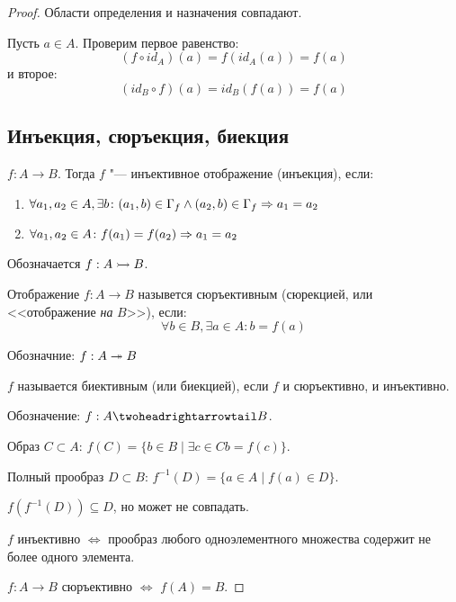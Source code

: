 \begin{proof}

Области определения и назначения совпадают.

Пусть $a \in A$. Проверим первое равенство:
\[(f \circ id_A)(a) = f(id_A(a)) = f(a)\]
и второе:
\[(id_B \circ f)(a) = id_B(f(a)) = f(a)\]

\subsection{Инъекция, сюръекция, биекция}
\begin{Def}
$f: A \to B$. Тогда $f$ "--- инъективное отображение (инъекция), если:

\begin{enumerate}
\item $\forall a_1, a_2 \in A, \exists b\colon (a_1, b) \in \Gamma_f \wedge (a_2, b) \in \Gamma_f \Rightarrow a_1 = a_2$
\item $\forall a_1, a_2 \in A\colon f(a_1) = f(a_2) \Rightarrow a_1 = a_2$
\end{enumerate}

Обозначается $f: A \rightarrowtail B$.
\end{Def}

\begin{Def}
Отображение $f: A \to B$ назывется сюръективным (сюрекцией, или <<отображение \textit{на} $B$>>), если:
\[\forall b \in B, \exists a \in A\colon b = f(a)\]

Обозначние: $f: A \twoheadrightarrow B$
\end{Def}

\begin{Def}
$f$ называется биективным (или биекцией), если $f$ и сюръективно, и инъективно.

Обозначение: $f: A \thrat B$.
\end{Def}

\begin{Def} 
Образ $C \subset A$: $f(C) = \{b \in B \mid \exists c \in C b = f(c)\}$.
\end{Def}

\begin{Def} 
Полный прообраз $D \subset B$: $f^{-1}(D) = \{a \in A \mid f(a) \in D\}$.
\end{Def}

$f(f^{-1}(D)) \subseteq D$, но может не совпадать.

$f$ инъективно $\iff$ прообраз любого одноэлементного множества содержит не более одного элемента.

$f : A \to B$ сюръективно $\iff$ $f(A) = B$.


\end{proof}
